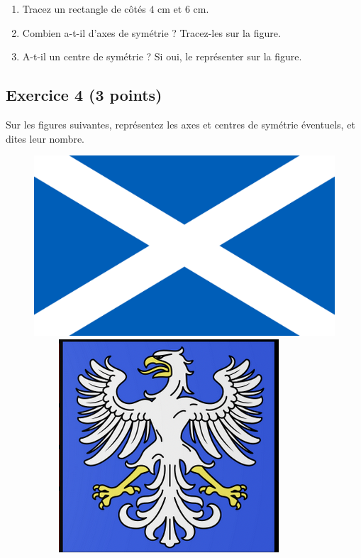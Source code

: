 \documentclass[14 pt]{extarticle}
\theoremstyle{plain}
\begin{document}
 \begin{enumerate}
 \item Tracez un rectangle de côtés $4$ cm et $6$ cm. 
 \item Combien a-t-il d'axes de symétrie ? Tracez-les sur la figure.
 \item A-t-il un centre de symétrie ? Si oui, le représenter sur la
 figure. 
 \end{enumerate}
 
\subsection*{Exercice 4 (3 points)} 

Sur les figures suivantes, représentez les axes et centres de symétrie éventuels, et dites leur nombre.  

\begin{figure}[H]
\center 
\includegraphics[scale=.06]{ecosse.png}\ \ \ \ \ 
\includegraphics[scale=.6]{Blason2.png}\ \ \ \ \ 

\end{figure}
\end{document}
